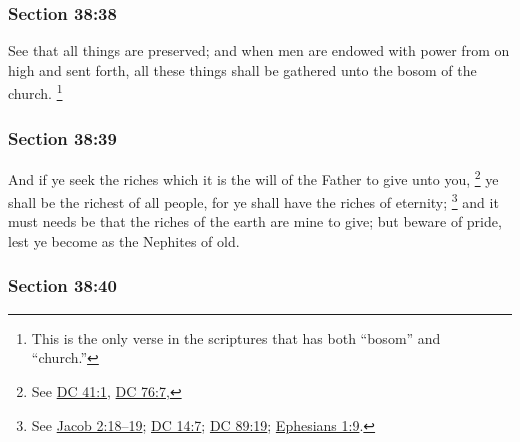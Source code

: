 	\subsubsection{Section 38:38} %
		\label{DC38-38}

		See that all things are preserved; and when men are endowed with power from on high and sent forth, all these things shall be gathered unto the bosom of the church.%
			\footnote{%
				This is the only verse in the scriptures that has both ``bosom'' and ``church.''
				}


	\subsubsection{Section 38:39} %
		\label{DC38-39}

		And if ye seek the riches which it is the will of the Father to give unto you,%
			\footnote{%
				See \hyperref[DC41-1]{DC 41:1}, \hyperref[DC76-7]{DC 76:7},
				}
		ye shall be the richest of all people, for ye shall have the riches of eternity;%
			\footnote{%
				See \hyperref[JACOB-2-18]{Jacob 2:18--19}; \hyperref[DC14-7]{DC 14:7}; \hyperref[DC89-19]{DC 89:19}; \hyperref[EPHESIANS-1-9]{Ephesians 1:9}.
				}
		and it must needs be that the riches of the earth are mine to give; but beware of pride, lest ye become as the Nephites of old.


	\subsubsection{Section 38:40} %
		\label{DC38-40}

